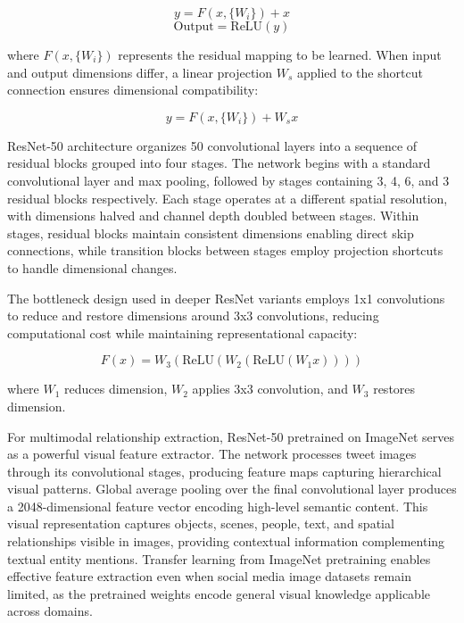 \documentclass[12pt,a4paper]{report}
\begin{document}
\begin{equation}
y = F(x, \{W_i\}) + x
\end{equation}
\begin{equation}
\text{Output} = \text{ReLU}(y)
\end{equation}

where $F(x, \{W_i\})$ represents the residual mapping to be learned. When input and output dimensions differ, a linear projection $W_s$ applied to the shortcut connection ensures dimensional compatibility:

\begin{equation}
y = F(x, \{W_i\}) + W_s x
\end{equation}

ResNet-50 architecture organizes 50 convolutional layers into a sequence of residual blocks grouped into four stages. The network begins with a standard convolutional layer and max pooling, followed by stages containing 3, 4, 6, and 3 residual blocks respectively. Each stage operates at a different spatial resolution, with dimensions halved and channel depth doubled between stages. Within stages, residual blocks maintain consistent dimensions enabling direct skip connections, while transition blocks between stages employ projection shortcuts to handle dimensional changes.

The bottleneck design used in deeper ResNet variants employs 1x1 convolutions to reduce and restore dimensions around 3x3 convolutions, reducing computational cost while maintaining representational capacity:

\begin{equation}
F(x) = W_3(\text{ReLU}(W_2(\text{ReLU}(W_1 x))))
\end{equation}

where $W_1$ reduces dimension, $W_2$ applies 3x3 convolution, and $W_3$ restores dimension.

For multimodal relationship extraction, ResNet-50 pretrained on ImageNet serves as a powerful visual feature extractor. The network processes tweet images through its convolutional stages, producing feature maps capturing hierarchical visual patterns. Global average pooling over the final convolutional layer produces a 2048-dimensional feature vector encoding high-level semantic content. This visual representation captures objects, scenes, people, text, and spatial relationships visible in images, providing contextual information complementing textual entity mentions. Transfer learning from ImageNet pretraining enables effective feature extraction even when social media image datasets remain limited, as the pretrained weights encode general visual knowledge applicable across domains.
\end{document}
